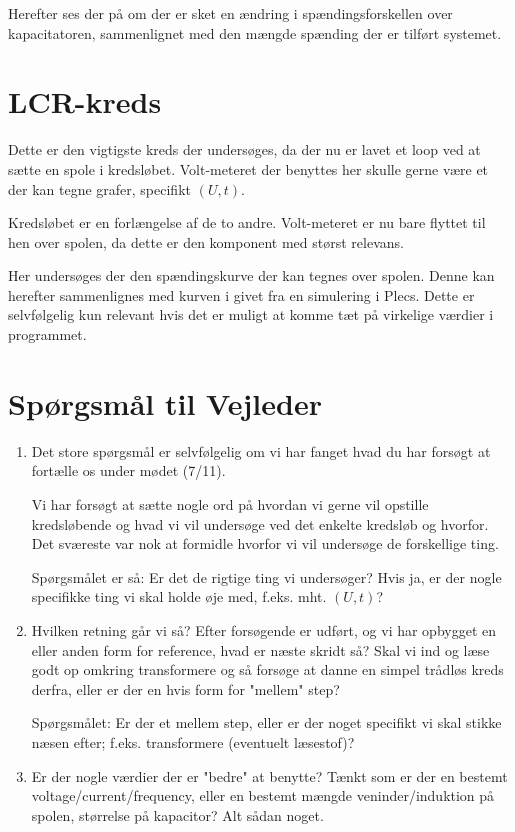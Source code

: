 \documentclass[a4paper,11pt]{memoir}
\begin{document}
Herefter ses der på om der er sket en ændring i spændingsforskellen over kapacitatoren, sammenlignet med den mængde spænding der er tilført systemet.
\section{LCR-kreds}
Dette er den vigtigste kreds der undersøges, da der nu er lavet et loop ved at sætte en spole i kredsløbet. Volt-meteret der benyttes her skulle gerne være et der kan tegne grafer, specifikt $(U,t)$.

Kredsløbet er en forlængelse af de to andre. Volt-meteret er nu bare flyttet til hen over spolen, da dette er den komponent med størst relevans.

Her undersøges der den spændingskurve der kan tegnes over spolen. Denne kan herefter sammenlignes med kurven i givet fra en simulering i Plecs. Dette er selvfølgelig kun relevant hvis det er muligt at komme tæt på virkelige værdier i programmet.
\newpage

\section{Spørgsmål til Vejleder}
\begin{enumerate}
\item Det store spørgsmål er selvfølgelig om vi har fanget hvad du har forsøgt at fortælle os under mødet (7/11).

Vi har forsøgt at sætte nogle ord på hvordan vi gerne vil opstille kredsløbende og hvad vi vil undersøge ved det enkelte kredsløb og hvorfor. Det sværeste var nok at formidle hvorfor vi vil undersøge de forskellige ting.

Spørgsmålet er så: Er det de rigtige ting vi undersøger? Hvis ja, er der nogle specifikke ting vi skal holde øje med, f.eks. mht. $(U,t)$?

\item Hvilken retning går vi så? Efter forsøgende er udført, og vi har opbygget en eller anden form for reference, hvad er næste skridt så? Skal vi ind og læse godt op omkring transformere og så forsøge at danne en simpel trådløs kreds derfra, eller er der en hvis form for "mellem" step?

Spørgsmålet: Er der et mellem step, eller er der noget specifikt vi skal stikke næsen efter; f.eks. transformere (eventuelt læsestof)?

\item Er der nogle værdier der er "bedre" at benytte? Tænkt som er der en bestemt voltage/current/frequency, eller en bestemt mængde veninder/induktion på spolen, størrelse på kapacitor? Alt sådan noget.

\end{enumerate}
\end{document}
